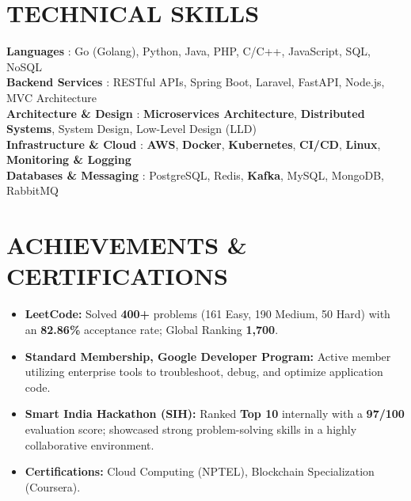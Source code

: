 \documentclass[letterpaper,11pt]{article}
\newcommand{\resumeItem}[1]{\item\small{{#1 \vspace{-1pt}}}}
\newcommand{\resumeItemListStart}{\begin{itemize}}
\newcommand{\resumeItemListEnd}{\end{itemize}\vspace{0pt}}
\begin{document}
\section{TECHNICAL SKILLS}
 \begin{itemize}[leftmargin=0in, label={}]
    \small{\item{
     \textbf{Languages} {: Go (Golang), Python, Java, PHP, C/C++, JavaScript, SQL, NoSQL}\vspace{2pt} \\
     \textbf{Backend Services} {: RESTful APIs, Spring Boot, Laravel, FastAPI, Node.js, MVC Architecture}\vspace{2pt} \\
     \textbf{Architecture \& Design} {: \textbf{Microservices Architecture}, \textbf{Distributed Systems}, System Design, Low-Level Design (LLD)}\vspace{2pt} \\
     \textbf{Infrastructure \& Cloud} {: \textbf{AWS}, \textbf{Docker}, \textbf{Kubernetes}, \textbf{CI/CD}, \textbf{Linux}, \textbf{Monitoring \& Logging}}\vspace{2pt} \\
     \textbf{Databases \& Messaging} {: PostgreSQL, Redis, \textbf{Kafka}, MySQL, MongoDB, RabbitMQ}
    }}
 \end{itemize}

\section{ACHIEVEMENTS \& CERTIFICATIONS}
    \resumeItemListStart
        \resumeItem{\textbf{LeetCode:} Solved \textbf{400+} problems (161 Easy, 190 Medium, 50 Hard) with an \textbf{82.86\%} acceptance rate; Global Ranking \textbf{1,700}.}
        \resumeItem{\textbf{Standard Membership, Google Developer Program:} Active member utilizing enterprise tools to troubleshoot, debug, and optimize application code.}
        \resumeItem{\textbf{Smart India Hackathon (SIH):} Ranked \textbf{Top 10} internally with a \textbf{97/100} evaluation score; showcased strong problem-solving skills in a highly collaborative environment.}
        \resumeItem{\textbf{Certifications:} Cloud Computing (NPTEL), Blockchain Specialization (Coursera).}
    \resumeItemListEnd
\end{document}
